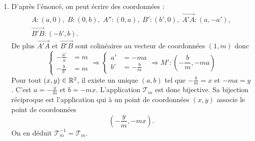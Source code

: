 \begin{enumerate}
 \item D'après l'énoncé, on peut écrire des coordonnées :
 \begin{multline*}
  A:(a,0),\; B:(0,b),\; A'':(0,a),\; B':(b',0),\; \overrightarrow{A'A}:(a,-a'), \\
  \overrightarrow{B'B}:(-b',b).
 \end{multline*}
De plus $\overrightarrow{A'A}$ et $\overrightarrow{B'B}$ sont colinéaires au vecteur de coordonnées $(1,m)$ donc
\begin{displaymath}
 \left\lbrace
   \begin{align}
    -\frac{a'}{a} &= m \\ -\frac{b}{b'} &= m
   \end{align}
  \right. \Rightarrow
  \left\lbrace
  \begin{align}
   a' &= -ma \\ b' &= -\frac{b}{m}
  \end{align}
  \right. \Rightarrow
  M':(- \frac{b}{m}, -ma)
\end{displaymath}
Pour tout $(x,y)\in \mathbb{R}^2$, il existe un unique $(a,b)$ tel que $-\frac{b}{m} = x$  et $-ma = y$. C'est $a = - \frac{y}{m}$ et $b = -mx$. L'application $\mathcal{T}_m$ est donc bijective. Sa bijection réciproque est l'application qui à un point de coordonnées $(x,y)$ associe le point de coordonnées
\begin{displaymath}
 (-\frac{y}{m}, -mx).
\end{displaymath}
On en déduit $\mathcal{T}_m^{-1} = \mathcal{T}_m$.


\end{enumerate}
